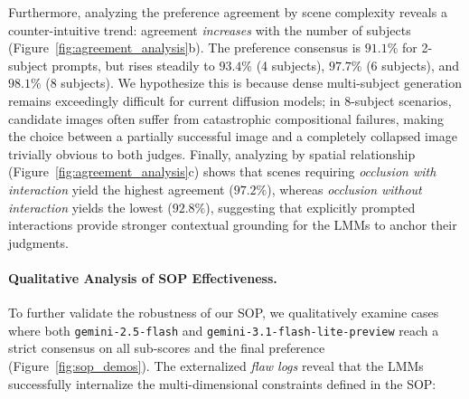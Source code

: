 Furthermore, analyzing the preference agreement by scene complexity reveals a counter-intuitive trend: agreement \emph{increases} with the number of subjects (Figure~\ref{fig:agreement_analysis}b). The preference consensus is $91.1\%$ for 2-subject prompts, but rises steadily to $93.4\%$ (4 subjects), $97.7\%$ (6 subjects), and $98.1\%$ (8 subjects). We hypothesize this is because dense multi-subject generation remains exceedingly difficult for current diffusion models; in 8-subject scenarios, candidate images often suffer from catastrophic compositional failures, making the choice between a partially successful image and a completely collapsed image trivially obvious to both judges. Finally, analyzing by spatial relationship (Figure~\ref{fig:agreement_analysis}c) shows that scenes requiring \emph{occlusion with interaction} yield the highest agreement ($97.2\%$), whereas \emph{occlusion without interaction} yields the lowest ($92.8\%$), suggesting that explicitly prompted interactions provide stronger contextual grounding for the LMMs to anchor their judgments.

\paragraph{Qualitative Analysis of SOP Effectiveness.}
To further validate the robustness of our SOP, we qualitatively examine cases where both \texttt{gemini-2.5-flash} and \texttt{gemini-3.1-flash-lite-preview} reach a strict consensus on all sub-scores and the final preference (Figure~\ref{fig:sop_demos}). The externalized \emph{flaw logs} reveal that the LMMs successfully internalize the multi-dimensional constraints defined in the SOP:

